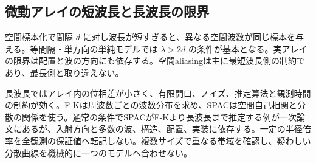 \subsection{微動アレイの短波長と長波長の限界}
\label{theory:exploration:arraylimits}
空間標本化で間隔 \(d\) に対し波長が短すぎると、異なる空間波数が同じ標本を与える。等間隔・単方向の単純モデルでは \(\lambda>2d\) の条件が基本となる。実アレイの限界は配置と波の方向にも依存する。空間aliasingは主に最短波長側の制約であり、最長側と取り違えない\cite{japansea_spac2017}。

長波長ではアレイ内の位相差が小さく、有限開口、ノイズ、推定算法と観測時間の制約が効く。F-Kは周波数ごとの波数分布を求め、SPACは空間自己相関と分散の関係を使う。通常の条件でSPACがF-Kより長波長まで推定する例が一次論文にあるが、入射方向と多数の波、構造、配置、実装に依存する\cite{array_limits2002}。一定の半径倍率を全観測の保証値へ転記しない。複数サイズで重なる帯域を確認し、疑わしい分散曲線を機械的に一つのモデルへ合わせない。
